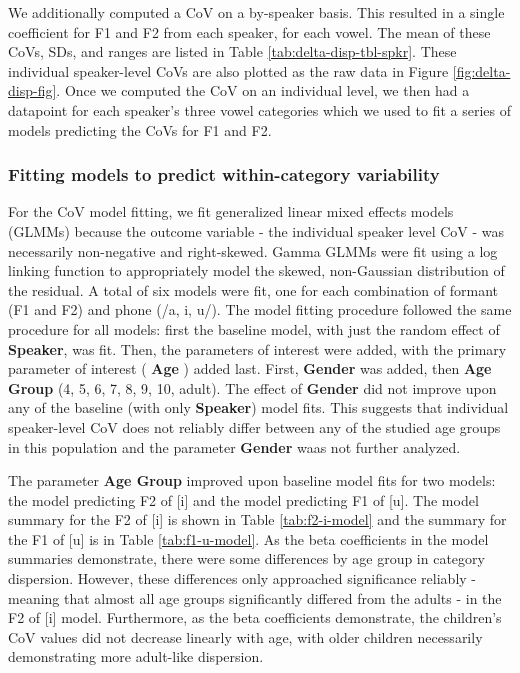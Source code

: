 \documentclass[
]{article}
\begin{document}
We additionally computed a CoV on a by-speaker basis. This resulted in a single coefficient for F1 and F2 from each speaker, for each vowel. The mean of these CoVs, SDs, and ranges are listed in Table \ref{tab:delta-disp-tbl-spkr}. These individual speaker-level CoVs are also plotted as the raw data in Figure \ref{fig:delta-disp-fig}. Once we computed the CoV on an individual level, we then had a datapoint for each speaker's three vowel categories which we used to fit a series of models predicting the CoVs for F1 and F2.

\hypertarget{fitting-models-to-predict-within-category-variability}{%
\subsubsection{Fitting models to predict within-category variability}\label{fitting-models-to-predict-within-category-variability}}

For the CoV model fitting, we fit generalized linear mixed effects models (GLMMs) because the outcome variable - the individual speaker level CoV - was necessarily non-negative and right-skewed. Gamma GLMMs were fit using a log linking function to appropriately model the skewed, non-Gaussian distribution of the residual. A total of six models were fit, one for each combination of formant (F1 and F2) and phone (/a, i, u/). The model fitting procedure followed the same procedure for all models: first the baseline model, with just the random effect of \textbf{Speaker}, was fit. Then, the parameters of interest were added, with the primary parameter of interest ( \textbf{Age} ) added last. First, \textbf{Gender} was added, then \textbf{Age Group} (4, 5, 6, 7, 8, 9, 10, adult). The effect of \textbf{Gender} did not improve upon any of the baseline (with only \textbf{Speaker}) model fits. This suggests that individual speaker-level CoV does not reliably differ between any of the studied age groups in this population and the parameter \textbf{Gender} waas not further analyzed.

The parameter \textbf{Age Group} improved upon baseline model fits for two models: the model predicting F2 of {[}i{]} and the model predicting F1 of {[}u{]}. The model summary for the F2 of {[}i{]} is shown in Table \ref{tab:f2-i-model} and the summary for the F1 of {[}u{]} is in Table \ref{tab:f1-u-model}. As the beta coefficients in the model summaries demonstrate, there were some differences by age group in category dispersion. However, these differences only approached significance reliably - meaning that almost all age groups significantly differed from the adults - in the F2 of {[}i{]} model. Furthermore, as the beta coefficients demonstrate, the children's CoV values did not decrease linearly with age, with older children necessarily demonstrating more adult-like dispersion.
\end{document}
